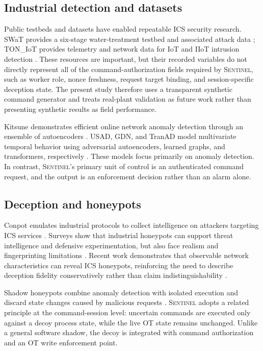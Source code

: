 \documentclass[journal]{IEEEtran}
\newcommand{\sentinel}{\textsc{Sentinel}}
\begin{document}
\subsection{Industrial detection and datasets}
Public testbeds and datasets have enabled repeatable ICS security research. SWaT provides a six-stage water-treatment testbed and associated attack data \cite{swat_testbed,swat_dataset}; TON\_IoT provides telemetry and network data for IoT and IIoT intrusion detection \cite{toniot}. These resources are important, but their recorded variables do not directly represent all of the command-authorization fields required by \sentinel, such as worker role, nonce freshness, request target binding, and session-specific deception state. The present study therefore uses a transparent synthetic command generator and treats real-plant validation as future work rather than presenting synthetic results as field performance.

Kitsune demonstrates efficient online network anomaly detection through an ensemble of autoencoders \cite{kitsune}. USAD, GDN, and TranAD model multivariate temporal behavior using adversarial autoencoders, learned graphs, and transformers, respectively \cite{usad,gdn,tranad}. These models focus primarily on anomaly detection. In contrast, \sentinel's primary unit of control is an authenticated command request, and the output is an enforcement decision rather than an alarm alone.

\subsection{Deception and honeypots}
Conpot emulates industrial protocols to collect intelligence on attackers targeting ICS services \cite{conpot}. Surveys show that industrial honeypots can support threat intelligence and defensive experimentation, but also face realism and fingerprinting limitations \cite{ics_honeypot_survey}. Recent work demonstrates that observable network characteristics can reveal ICS honeypots, reinforcing the need to describe deception fidelity conservatively rather than claim indistinguishability \cite{time_to_lie}.

Shadow honeypots combine anomaly detection with isolated execution and discard state changes caused by malicious requests \cite{shadow}. \sentinel{} adopts a related principle at the command-session level: uncertain commands are executed only against a decoy process state, while the live OT state remains unchanged. Unlike a general software shadow, the decoy is integrated with command authorization and an OT write enforcement point.
\end{document}
